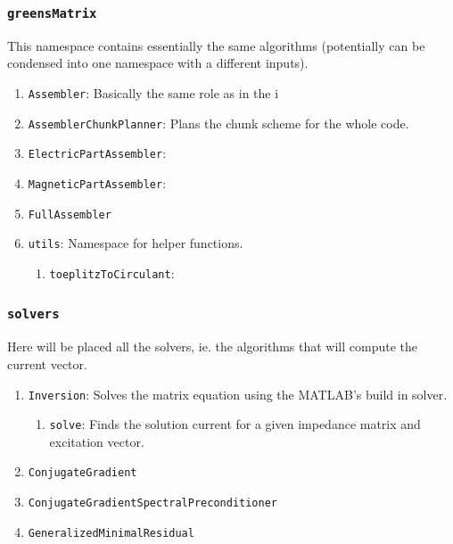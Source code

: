 \documentclass[9pt]{article}
\begin{document}
    \subsubsection{\texttt{greensMatrix}}

    This namespace contains essentially the same algorithms (potentially can be condensed into one namespace with a different inputs).

    \begin{enumerate}[label=\Roman*.]
        \item \texttt{Assembler}: Basically the same role as in the i
        \item \texttt{AssemblerChunkPlanner}: Plans the chunk scheme for the whole code.
        \item \texttt{ElectricPartAssembler}:
        \item \texttt{MagneticPartAssembler}:
        \item \texttt{FullAssembler}
        \item \texttt{utils}: Namespace for helper functions.
        \begin{enumerate}[label=\roman*.]
            \item \texttt{toeplitzToCirculant}:
        \end{enumerate}
    \end{enumerate}

    \subsubsection{\texttt{solvers}}

    Here will be placed all the solvers, ie. the algorithms that will compute the current vector.

    \begin{enumerate}[label=\Roman*.]
        \item \texttt{Inversion}: Solves the matrix equation using the MATLAB's build in solver.
        \begin{enumerate}[label=\roman*.]
            \item \texttt{solve}: Finds the solution current for a given impedance matrix and excitation vector.
        \end{enumerate}
        \item \texttt{ConjugateGradient}
        \item \texttt{ConjugateGradientSpectralPreconditioner}
        \item \texttt{GeneralizedMinimalResidual}
    \end{enumerate}
\end{document}
